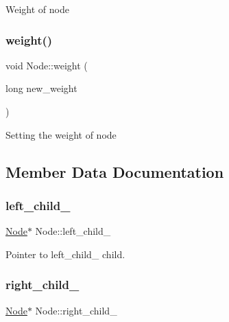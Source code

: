Weight of node \mbox{\label{class_node_a33692230d8ddf48354a54c2d461243a4}} 
\subsubsection{\texorpdfstring{weight()}{weight()}\hspace{0.1cm}{\footnotesize\ttfamily [2/2]}}
{\footnotesize\ttfamily void Node\+::weight (\begin{DoxyParamCaption}\item[{long}]{new\+\_\+weight }\end{DoxyParamCaption})}

Setting the weight of node 

\subsection{Member Data Documentation}
\mbox{\label{class_node_a5ee0db484771d8654c32e7863fba292e}} 
\subsubsection{\texorpdfstring{left\+\_\+child\+\_\+}{left\_child\_}}
{\footnotesize\ttfamily \hyperlink{class_node}{Node}$\ast$ Node\+::left\+\_\+child\+\_\+\hspace{0.3cm}{\ttfamily [protected]}}



Pointer to left\+\_\+child\+\_\+ child. 

\mbox{\label{class_node_abf180145dff7ffce95b3b39bfe24d2f6}} 
\subsubsection{\texorpdfstring{right\+\_\+child\+\_\+}{right\_child\_}}
{\footnotesize\ttfamily \hyperlink{class_node}{Node}$\ast$ Node\+::right\+\_\+child\+\_\+\hspace{0.3cm}{\ttfamily [protected]}}



